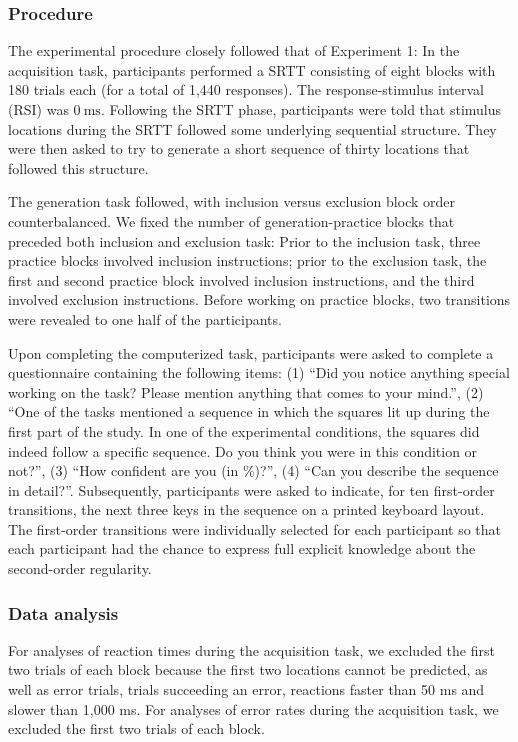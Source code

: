 \documentclass[man]{apa6}
\theoremstyle{definition}
\theoremstyle{definition}
\theoremstyle{definition}
\theoremstyle{remark}
\begin{document}
\subsubsection{Procedure}\label{procedure-2}

The experimental procedure closely followed that of Experiment 1: In the
acquisition task, participants performed a SRTT consisting of eight
blocks with 180 trials each (for a total of 1,440 responses). The
response-stimulus interval (RSI) was \(0~\text{ms}\). Following the SRTT
phase, participants were told that stimulus locations during the SRTT
followed some underlying sequential structure. They were then asked to
try to generate a short sequence of thirty locations that followed this
structure.

The generation task followed, with inclusion versus exclusion block
order counterbalanced. We fixed the number of generation-practice blocks
that preceded both inclusion and exclusion task: Prior to the inclusion
task, three practice blocks involved inclusion instructions; prior to
the exclusion task, the first and second practice block involved
inclusion instructions, and the third involved exclusion instructions.
Before working on practice blocks, two transitions were revealed to one
half of the participants.

Upon completing the computerized task, participants were asked to
complete a questionnaire containing the following items: (1)
\enquote{Did you notice anything special working on the task? Please
mention anything that comes to your mind.}, (2) \enquote{One of the
tasks mentioned a sequence in which the squares lit up during the first
part of the study. In one of the experimental conditions, the squares
did indeed follow a specific sequence. Do you think you were in this
condition or not?}, (3) \enquote{How confident are you (in \%)?}, (4)
\enquote{Can you describe the sequence in detail?}. Subsequently,
participants were asked to indicate, for ten first-order transitions,
the next three keys in the sequence on a printed keyboard layout. The
first-order transitions were individually selected for each participant
so that each participant had the chance to express full explicit
knowledge about the second-order regularity.

\subsubsection{Data analysis}\label{data-analysis-2}

For analyses of reaction times during the acquisition task, we excluded
the first two trials of each block because the first two locations
cannot be predicted, as well as error trials, trials succeeding an
error, reactions faster than 50 ms and slower than 1,000 ms. For
analyses of error rates during the acquisition task, we excluded the
first two trials of each block.
\end{document}
